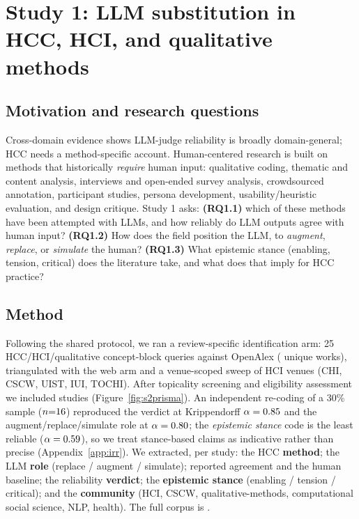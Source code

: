 \section{Study 1: LLM substitution in HCC, HCI, and qualitative methods}
\subsection{Motivation and research questions}
Cross-domain evidence shows LLM-judge reliability is broadly domain-general; HCC needs a method-specific account. Human-centered research is built on methods
that historically \emph{require} human input: qualitative coding, thematic and content analysis, interviews and
open-ended survey analysis, crowdsourced annotation, participant studies, persona development, usability/heuristic
evaluation, and design critique. Study 1 asks: \textbf{(RQ1.1)} which of these methods have been attempted with
LLMs, and how reliably do LLM outputs agree with human input? \textbf{(RQ1.2)} How does the field position the
LLM, to \emph{augment}, \emph{replace}, or \emph{simulate} the human? \textbf{(RQ1.3)} What epistemic stance
(enabling, tension, critical) does the literature take, and what does that imply for HCC practice?

\subsection{Method}
Following the shared protocol, we ran a review-specific identification arm: 25 HCC/HCI/qualitative concept-block
queries against OpenAlex (\SToa{} unique works), triangulated with the web arm and a venue-scoped sweep of HCI venues (CHI, CSCW, UIST, IUI, TOCHI). After topicality screening and eligibility assessment we included
\STN{} studies (Figure~\ref{fig:s2prisma}). An independent re-coding of a 30\% sample ($n{=}16$) reproduced
the verdict at Krippendorff $\alpha=0.85$ and the augment/replace/simulate role at $\alpha=0.80$; the
\emph{epistemic stance} code is the least reliable ($\alpha=0.59$), so we treat stance-based claims as
indicative rather than precise (Appendix~\ref{app:irr}). We extracted, per study: the HCC \textbf{method}; the LLM \textbf{role}
(replace / augment / simulate); reported agreement and the human baseline; the reliability \textbf{verdict};
the \textbf{epistemic stance} (enabling / tension / critical); and the \textbf{community} (HCI, CSCW,
qualitative-methods, computational social science, NLP, health). The full corpus is \sttwotabref.

